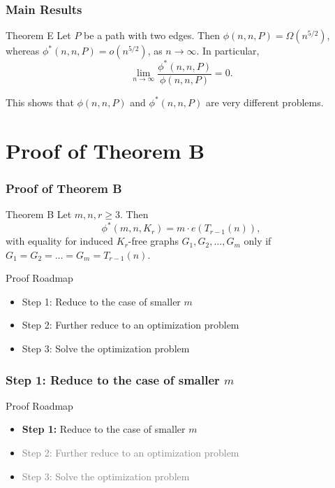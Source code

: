 \documentclass{beamer}
\begin{document}
\begin{frame}
  \frametitle{Main Results}

  \begin{block}{Theorem E}
    Let $P$ be a path with two edges. Then $\phi(n, n, P) = \Omega(n^{5/2})$, whereas $\phi^*(n, n, P) = o(n^{5/2})$, as $n \rightarrow \infty$. In particular, 
    \[ 
      \lim_{n \rightarrow \infty} \frac{\phi^*(n, n, P)}{\phi(n, n, P)} = 0.
    \]
  \end{block}

  \pause

  \vspace{0.3cm}

  This shows that $\phi(n, n, P)$ and $\phi^*(n, n, P)$ are very different problems.
\end{frame}

\section{Proof of Theorem B}

\begin{frame}
  \frametitle{Proof of Theorem B}

  \begin{block}{Theorem B}
    Let $m, n, r \geq 3$. Then 
    \[
      \phi^*(m,n,K_{r}) = m \cdot e(T_{r - 1}(n)),
    \]
    with equality for induced $K_{r}$-free graphs $G_1, G_2, \dots, G_m$ only if $G_1 = G_2 = \dots = G_m = T_{r - 1}(n)$.  
  \end{block}

  \vspace{0.3cm}

  Proof Roadmap

  \begin{itemize}
    \item Step 1: Reduce to the case of smaller $m$
    \item Step 2: Further reduce to an optimization problem
    \item Step 3: Solve the optimization problem
  \end{itemize}
\end{frame}

\begin{frame}
  \frametitle{Step 1: Reduce to the case of smaller $m$}

  Proof Roadmap

  \begin{itemize}
    \item \textbf{Step 1:} Reduce to the case of smaller $m$
    \item \textcolor{gray}{Step 2: Further reduce to an optimization problem}
    \item \textcolor{gray}{Step 3: Solve the optimization problem}
  \end{itemize}
\end{frame}
\end{document}
